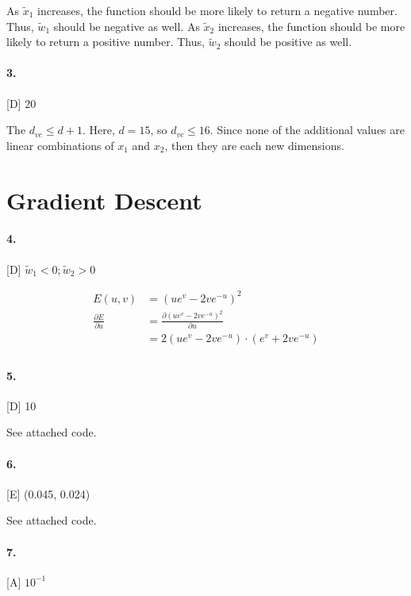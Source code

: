 \documentclass[10pt,letter]{article}
\begin{document}
	As $\widetilde x_1$ increases, the function should be more likely to return a negative number. Thus, $\widetilde {w }_1$ should be negative as well. As $ \widetilde x_2$ increases, the function should be more likely to return a positive number. Thus, $\widetilde { w }_2$ should be positive as well.

\paragraph{3.} [D] 20

	The $d_{vc} \leq d + 1$. Here, $d = 15$, so $d_{vc} \leq 16$. Since none of the additional values are linear combinations of $x_1$ and $x_2$, then they are each new dimensions. 

\section*{Gradient Descent}

\paragraph{4.} [D] $\widetilde{w}_1 < 0; \widetilde{w}_2 > 0$

	\begin{align*}
	E(u,v) &= (ue^v - 2ve^{-u})^2 \\
	\frac{\partial E}{\partial u} &= \frac{\partial (ue^v - 2ve^{-u})^2}{\partial u} \\
	&= 2(ue^v - 2ve^{-u})\cdot(e^v + 2ve^{-u}) \\
	\end{align*}

\paragraph{5.} [D] 10

	See attached code.

\paragraph{6.} [E] (0.045, 0.024)

	See attached code. 

\paragraph{7.} [A] $10^{-1}$
\end{document}
